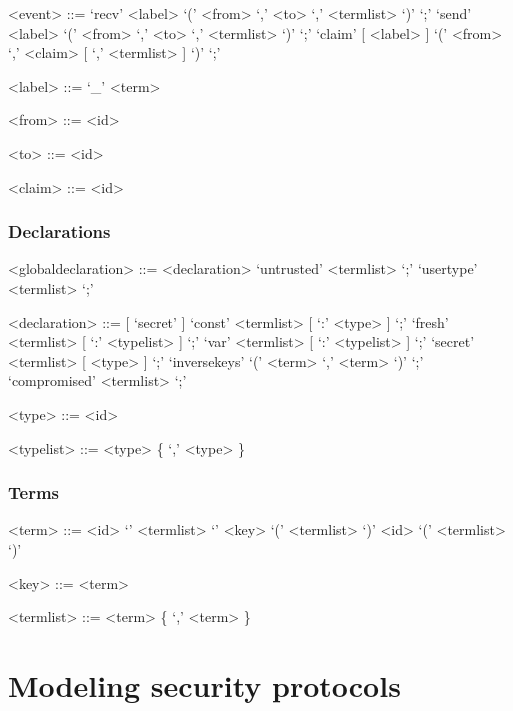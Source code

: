 \documentclass{book}
\begin{document}
\begin{grammar}

<event>		::= `recv' <label> `(' <from> `,' <to> `,' <termlist> `)' `;'
		\alt `send' <label> `(' <from> `,' <to> `,' <termlist> `)' `;'
		\alt `claim' [ <label> ] `(' <from> `,' <claim> [ `,'
		<termlist> ] `)' `;'


<label>		::= `_' <term>

<from>		::= <id>

<to>		::= <id>

<claim>     ::= <id>


\end{grammar}
\subsection{Declarations}
\begin{grammar}

<globaldeclaration>	::= <declaration>
		\alt `untrusted' <termlist> `;'
		\alt `usertype' <termlist> `;'

<declaration>	::= [ `secret' ] `const' <termlist> [ `:' <type> ] `;'
		\alt [ `secret' ] `fresh' <termlist> [ `:' <typelist> ] `;'
		\alt [ `secret' ] `var' <termlist> [ `:' <typelist> ] `;'
		\alt `secret' <termlist> [ <type> ] `;'
		\alt `inversekeys' `(' <term> `,' <term> `)' `;'
		\alt `compromised' <termlist> `;'

<type>		::= <id>

<typelist>	::= <type> \{ `,' <type> \}

\end{grammar}
\subsection{Terms}
\begin{grammar}

<term>          ::= <id>
		\alt `{' <termlist> `}' <key>
		\alt `(' <termlist> `)'
		\alt <id> `(' <termlist> `)'

<key>		::= <term>

<termlist>	::= <term> \{ `,' <term> \}


\end{grammar}


\chapter{Modeling security protocols}
\label{sec:modeling}
\end{document}
